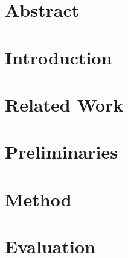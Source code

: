 \documentclass[a4paper,11pt,twoside]{pads-thesis}
\begin{document}

\gTitlePage

\newpage

\chapter*{Abstract} 



\tableofcontents

\cleardoublepage
\pagestyle{fancy}

\newcommand\RQone{RQ1}
\newcommand\RQtwo{RQ2}
\newcommand\RQthree{RQ3}
\newcommand\RQfourA{RQ4a}
\newcommand\RQfourB{RQ4b}
\newcommand\RQfive{RQ5}
\newcommand\RQsix{RQ6}
\newcommand\RGone{RG1}
\newcommand\RGtwo{RG2}
\newcommand\RGthree{RG3}
\newcommand\RGfourA{RG4a}
\newcommand\RGfourB{RG4b}
\newcommand\RGfive{RG5}
\newcommand\RGsix{RG6}

\chapter{Introduction} \label{chap:intro}


\chapter{Related Work} \label{chap:rw}


\chapter{Preliminaries} \label{chap:prelim}


\chapter{Method} \label{chap:method}


\chapter{Evaluation} \label{chap:eva}

\end{document}
